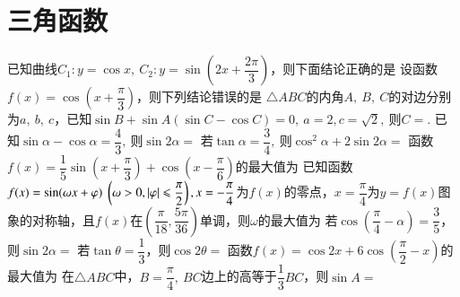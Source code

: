 \documentclass{BHCexam}
\begin{document}
\section{三角函数}
\begin{questions}
	\qs 已知曲线$ C_1:y=\cos x ,~C_2:y=\sin\left(2x+\dfrac{2\pi}{3}\right)$，则下面结论正确的是\xx
	\qs 设函数$f(x)=\cos\left(x+\dfrac{\pi}{3}\right)$，则下列结论错误的是\xx
	\qs $\triangle ABC$的内角$ A,~B,~C $的对边分别为$ a,~b,~c $，已知$ \sin B+\sin A\left(\sin C-\cos C\right)=0,~a=2,c=\sqrt{2},~ $则$ C= $\xx.
	\qs 已知$ \sin \alpha -\cos \alpha =\dfrac{4}{3} ,~$则$ \sin 2\alpha =$\xx
	\qs 若$ \tan \alpha=\dfrac{3}{4},~ $则$ \cos^2\alpha+2\sin2\alpha= $\xx
	\qs 函数$f(x)=\dfrac{1}{5}\sin\left(x+\dfrac{\pi}{3}\right)+\cos\left(x-\dfrac{\pi}{6}\right)$的最大值为\xx
	\question 已知函数$f(x)=\sin(\omega x+\varphi)~\left(\omega>0,\left| \varphi \right|\leqslant \dfrac{\pi}{2}\right),x=-\dfrac{\pi}{4}$为$f(x)$的零点，$x=\dfrac{\pi}{4}$为$y=f(x)$图象的对称轴，且$f(x)$在$\left(\dfrac{\pi}{18},\dfrac{5\pi}{36}\right)$单调，则$\omega$的最大值为\xx
	\qs 若$ \cos \left(\dfrac{\pi}{4}-\alpha\right)=\dfrac{3}{5} $，则$ \sin2\alpha= $\xx
	\qs 若$ \tan\theta=\dfrac{1}{3} $，则$ \cos2\theta= $\xx
	\qs 函数$f(x)=\cos 2x+6\cos\left(\dfrac{\pi}{2}-x\right)$的最大值为\xx
	\qs 在$\triangle ABC$中，$ B=\dfrac{\pi}{4} ,~BC$边上的高等于$ \dfrac{1}{3} BC$，则$ \sin A= $\xx

\end{questions}
\end{document}
